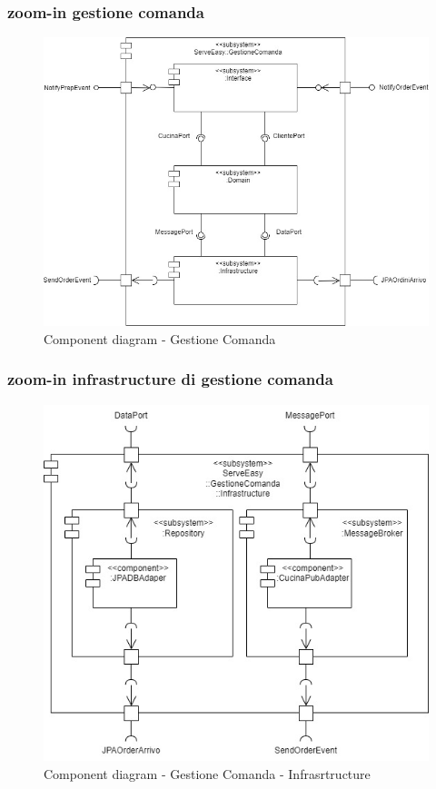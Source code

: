 \subsubsection{zoom-in gestione comanda}
\begin{figure}[H]
	\centering
	\includegraphics[scale=0.5]{iterazione1/images/component_comanda_cucina-GestioneComanda.jpg}
	\caption{Component diagram - Gestione Comanda\label{fig:component_diagram_gestione_comanda}}
\end{figure}


\subsubsection{zoom-in infrastructure di gestione comanda}
\begin{figure}[H]
	\centering
	\includegraphics[scale=0.5]{iterazione1/images/component_comanda_cucina-GestioneComanda__Infrastructure.jpg}
	\caption{Component diagram - Gestione Comanda - Infrasrtructure \label{fig:component_diagram_gestione_comanda_infrastracture}}
\end{figure}

